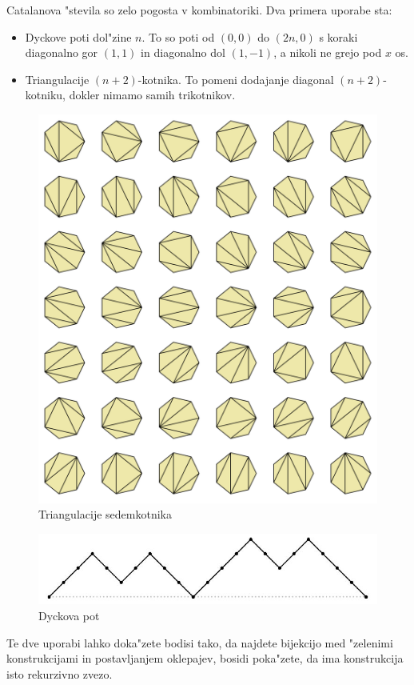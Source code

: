 \documentclass[a4paper,12pt]{article}
\theoremstyle{definition}
\theoremstyle{remark}
\begin{document}
Catalanova "stevila so zelo pogosta v kombinatoriki. Dva primera uporabe sta:
\begin{itemize}
	\item Dyckove poti dol"zine $n$. To so poti od $(0,0)$ do $(2n, 0)$ s koraki diagonalno gor $(1,1)$ in diagonalno dol $(1, -1)$, a nikoli ne grejo pod $x$ os.
	\item Triangulacije $(n + 2)$-kotnika. To pomeni dodajanje diagonal $(n+2)$-kotniku, dokler nimamo samih trikotnikov.
\end{itemize}

\begin{figure}[h!]
	\centering
	\includegraphics[scale=0.2]{triangulation}
	\caption{Triangulacije sedemkotnika}
\end{figure}
\begin{figure}[h!]
	\centering
	\includegraphics[scale=0.4]{dyck_pic}
	\caption{Dyckova pot}
\end{figure}
Te dve uporabi lahko doka"zete bodisi tako, da najdete bijekcijo med "zelenimi konstrukcijami in postavljanjem oklepajev, bosidi poka"zete, da ima konstrukcija isto rekurzivno zvezo.
\end{document}

